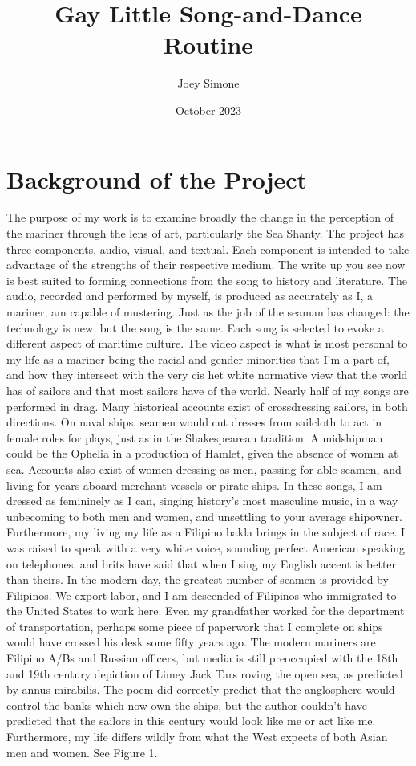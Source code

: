 \documentclass{article}[12pt,letterpaper]
\title{Gay Little Song-and-Dance Routine}
\author{Joey Simone}
\date{October 2023}
\begin{document}
\maketitle

\section{Background of the Project}
The purpose of my work is to examine broadly the change in the perception of the mariner through the lens of art, particularly the Sea Shanty. The project has three components, audio, visual, and textual. Each component is intended to take advantage of the strengths of their respective medium. The write up you see now is best suited to forming connections from the song to history and literature. The audio, recorded and performed by myself, is produced as accurately as I, a mariner, am capable of mustering. Just as the job of the seaman has changed: the technology is new, but the song is the same. Each song is selected to evoke a different aspect of maritime culture. The video aspect is what is most personal to my life as a mariner being the racial and gender minorities that I’m a part of, and how they intersect with the very cis het white normative view that the world has of sailors and that most sailors have of the world. Nearly half of my songs are performed in drag. Many historical accounts exist of crossdressing sailors, in both directions. On naval ships, seamen would cut dresses from sailcloth to act in female roles for plays, just as in the Shakespearean tradition. A midshipman could be the Ophelia in a production of Hamlet, given the absence of women at sea. Accounts also exist of women dressing as men, passing for able seamen, and living for years aboard merchant vessels or pirate ships. In these songs, I am dressed as femininely as I can, singing history’s most masculine music, in a way unbecoming to both men and women, and unsettling to your average shipowner. Furthermore, my living my life as a Filipino bakla brings in the subject of race. I was raised to speak with a very white voice, sounding perfect American speaking on telephones, and brits have said that when I sing my English accent is better than theirs. In the modern day, the greatest number of seamen is provided by Filipinos. We export labor, and I am descended of Filipinos who immigrated to the United States to work here. Even my grandfather worked for the department of transportation, perhaps some piece of paperwork that I complete on ships would have crossed his desk some fifty years ago. The modern mariners are Filipino A/Bs and Russian officers, but media is still preoccupied with the 18th and 19th century depiction of Limey Jack Tars roving the open sea, as predicted by annus mirabilis. The poem did correctly predict that the anglosphere would control the banks which now own the ships, but the author couldn’t have predicted that the sailors in this century would look like me or act like me. Furthermore, my life differs wildly from what the West expects of both Asian men and women. See Figure 1.
\end{document}
